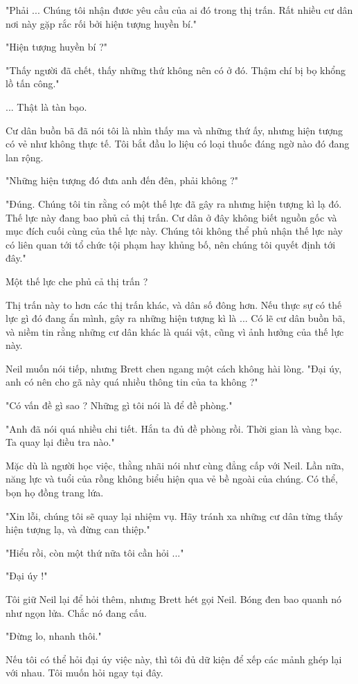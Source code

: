 "Phải ... Chúng tôi nhận đươc yêu cầu của ai đó trong thị trấn. Rất nhiều cư dân nơi này gặp rắc rối bởi hiện tượng huyền bí."

"Hiện tượng huyền bí ?"

"Thấy người đã chết, thấy những thứ không nên có ở đó. Thậm chí bị bọ khổng lồ tấn công."

... Thật là tàn bạo.

Cư dân buồn bã đã nói tôi là nhìn thấy ma và những thứ ấy, nhưng hiện tượng có vẻ như không thực tế. Tôi bắt đầu lo liệu có loại thuốc đáng ngờ nào đó đang lan rộng.

"Những hiện tượng đó đưa anh đến đên, phải không ?"

"Đúng. Chúng tôi tin rằng có một thế lực đã gây ra nhưng hiện tượng kì lạ đó. Thế lực này đang bao phủ cả thị trấn. Cư dân ở đây không biết nguồn gốc và mục đích cuối cùng của thế lực này. Chúng tôi không thể phủ nhận thế lực này có liên quan tới tổ chức tội phạm hay khủng bố, nên chúng tôi quyết định tới đây."

Một thế lực che phủ cả thị trấn ?

Thị trấn này to hơn các thị trấn khác, và dân số đông hơn. Nếu thực sự có thế lực gì đó đang ẩn mình, gây ra những hiện tượng kì là ... Có lẽ cư dân buồn bã, và niềm tin rằng những cư dân khác là quái vật, cũng vì ảnh hưởng của thế lực này.

Neil muốn nói tiếp, nhưng Brett chen ngang một cách không hài lòng. "Đại úy, anh có nên cho gã này quá nhiều thông tin của ta không ?"

"Có vấn đề gì sao ? Những gì tôi nói là để đề phòng."

"Anh đã nói quá nhiều chi tiết. Hắn ta đủ đề phòng rồi. Thời gian là vàng bạc. Ta quay lại điều tra nào."

Mặc dù là người học việc, thằng nhãi nói như cùng đẳng cấp với Neil. Lần nữa, năng lực và tuổi của rồng không biểu hiện qua vẻ bề ngoài của chúng. Có thể, bọn họ đồng trang lứa.

"Xin lỗi, chúng tôi sẽ quay lại nhiệm vụ. Hãy tránh xa những cư dân từng thấy hiện tượng lạ, và đừng can thiệp."

"Hiểu rồi, còn một thứ nữa tôi cần hỏi ..."

"Đại úy !"

Tôi giữ Neil lại để hỏi thêm, nhưng Brett hét gọi Neil. Bóng đen bao quanh nó như ngọn lửa. Chắc nó đang cấu.

"Đừng lo, nhanh thôi."

Nếu tôi có thể hỏi đại úy việc này, thì tôi đủ dữ kiện để xếp các mảnh ghép lại với nhau. Tôi muốn hỏi ngay tại đây.

